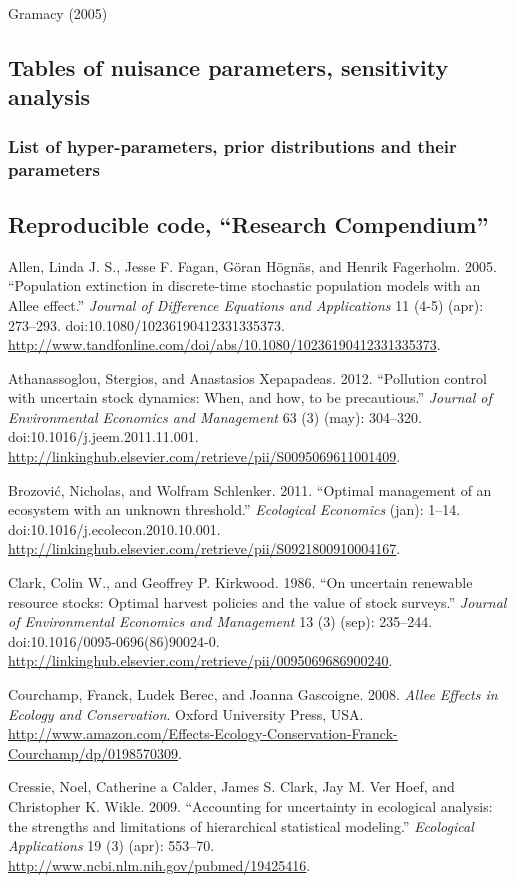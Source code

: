 \documentclass[author-year, review]{elsarticle} %
\begin{document}
Gramacy (2005)

\subsection{Tables of nuisance parameters, sensitivity analysis}

\subsubsection{List of hyper-parameters, prior distributions and their
parameters}

\subsection{Reproducible code, ``Research Compendium''}

Allen, Linda J. S., Jesse F. Fagan, Göran Högnäs, and Henrik Fagerholm.
2005. ``Population extinction in discrete-time stochastic population
models with an Allee effect.'' \emph{Journal of Difference Equations and
Applications} 11 (4-5) (apr): 273--293.
doi:10.1080/10236190412331335373.
\url{http://www.tandfonline.com/doi/abs/10.1080/10236190412331335373}.

Athanassoglou, Stergios, and Anastasios Xepapadeas. 2012. ``Pollution
control with uncertain stock dynamics: When, and how, to be
precautious.'' \emph{Journal of Environmental Economics and Management}
63 (3) (may): 304--320. doi:10.1016/j.jeem.2011.11.001.
\url{http://linkinghub.elsevier.com/retrieve/pii/S0095069611001409}.

Brozović, Nicholas, and Wolfram Schlenker. 2011. ``Optimal management of
an ecosystem with an unknown threshold.'' \emph{Ecological Economics}
(jan): 1--14. doi:10.1016/j.ecolecon.2010.10.001.
\url{http://linkinghub.elsevier.com/retrieve/pii/S0921800910004167}.

Clark, Colin W., and Geoffrey P. Kirkwood. 1986. ``On uncertain
renewable resource stocks: Optimal harvest policies and the value of
stock surveys.'' \emph{Journal of Environmental Economics and
Management} 13 (3) (sep): 235--244. doi:10.1016/0095-0696(86)90024-0.
\url{http://linkinghub.elsevier.com/retrieve/pii/0095069686900240}.

Courchamp, Franck, Ludek Berec, and Joanna Gascoigne. 2008. \emph{Allee
Effects in Ecology and Conservation}. Oxford University Press, USA.
\url{http://www.amazon.com/Effects-Ecology-Conservation-Franck-Courchamp/dp/0198570309}.

Cressie, Noel, Catherine a Calder, James S. Clark, Jay M. Ver Hoef, and
Christopher K. Wikle. 2009. ``Accounting for uncertainty in ecological
analysis: the strengths and limitations of hierarchical statistical
modeling.'' \emph{Ecological Applications} 19 (3) (apr): 553--70.
\url{http://www.ncbi.nlm.nih.gov/pubmed/19425416}.
\end{document}
